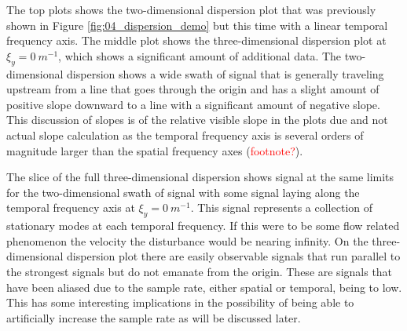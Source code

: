 The top plots shows the two-dimensional dispersion plot that was previously shown in Figure \ref{fig:04_dispersion_demo} but this time with a linear temporal frequency axis.
The middle plot shows the three-dimensional dispersion plot at $\xi_y=0\ m^{-1}$, which shows a significant amount of additional data.
The two-dimensional dispersion shows a wide swath of signal that is generally traveling upstream from a line that goes through the origin and has a slight amount of positive slope downward to a line with a significant amount of negative slope.
This discussion of slopes is of the relative visible slope in the plots due and not actual slope calculation as the temporal frequency axis is several orders of magnitude larger than the spatial frequency axes (\textcolor{red}{footnote?}).

The slice of the full three-dimensional dispersion shows signal at the same limits for the two-dimensional swath of signal with some signal laying along the temporal frequency axis at $\xi_y=0\ m^{-1}$.
This signal represents a collection of stationary modes at each temporal frequency.
If this were to be some flow related phenomenon the velocity the disturbance would be nearing infinity.
On the three-dimensional dispersion plot there are easily observable signals that run parallel to the strongest signals but do not emanate from the origin.
These are signals that have been aliased due to the sample rate, either spatial or temporal, being to low.  This has some interesting implications in the possibility of being able to artificially increase the sample rate as will be discussed later.

